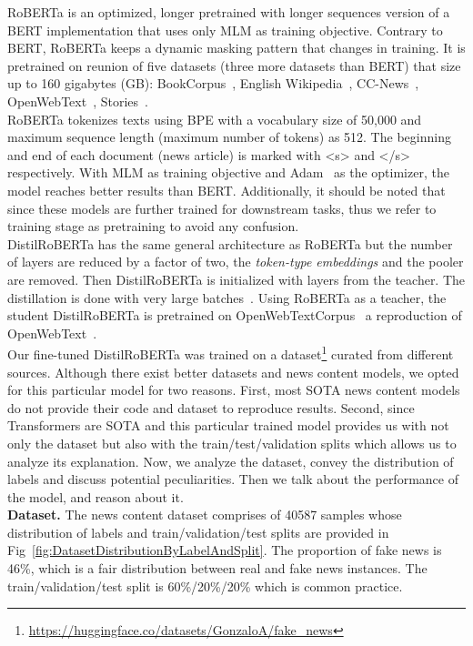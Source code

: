 RoBERTa is an optimized, longer pretrained with longer sequences version of a BERT implementation that uses only MLM
as training objective. Contrary to BERT, RoBERTa keeps a dynamic masking pattern that changes in training. It is
pretrained on reunion of five datasets (three more datasets than BERT) that size up to 160 gigabytes (GB): BookCorpus~\parencite{BookCorpus_Yukun},
English Wikipedia~\parencite{EnglishWikipedia_Wiki},
CC-News~\parencite{CCNews_Nagel}, OpenWebText~\parencite{OpenWebText_Radford},
Stories~\parencite{ASimpleMethodForCommonsenseReasoning_Trinh}.\\
RoBERTa tokenizes texts using BPE with a vocabulary size of 50,000 and maximum sequence length (maximum number of tokens) as 512. The beginning and end of each document (news article) is marked with <s> and </s> respectively. With MLM as training objective and Adam~\parencite*{Adam_Kingma} as the optimizer, the model reaches better results than BERT. Additionally, it should be noted that since these models are further trained for downstream tasks, thus we refer to training stage as pretraining to avoid any confusion. \\
DistilRoBERTa has the same general architecture as RoBERTa but the number of layers are reduced by a factor of two, the
\emph{token-type embeddings} and the pooler are removed. Then DistilRoBERTa is initialized with layers from the teacher.
The distillation is done with very large batches~\parencite{DistilBERT_Sanh}. Using RoBERTa as a teacher, the student DistilRoBERTa is pretrained on OpenWebTextCorpus~\parencite{OpenWebTextCorpus_Gokaslan} a reproduction of OpenWebText~\parencite{OpenWebText_Radford}.\\
Our fine-tuned DistilRoBERTa was trained on a dataset\footnote{\url{https://huggingface.co/datasets/GonzaloA/fake_news}} curated from different sources. Although there exist better datasets and news content models, we opted for this particular model for two reasons. First, most SOTA news content models do not provide their code and dataset to reproduce results. Second, since Transformers are SOTA and this particular trained model provides us with not only the dataset but also with the train/test/validation splits which allows us to analyze its explanation. Now, we analyze the dataset, convey the distribution of labels and discuss potential peculiarities. Then we talk about the performance of the model, and reason about it.\\
\textbf{Dataset.} The news content dataset comprises of 40587 samples whose distribution of labels and train/validation/test splits are provided in Fig~\ref{fig:DatasetDistributionByLabelAndSplit}. The proportion of fake news is 46\%, which is a fair distribution between real and fake news instances. The train/validation/test split is 60\%/20\%/20\% which is common practice.
